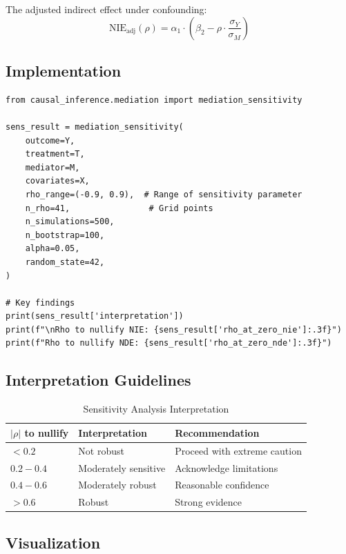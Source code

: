 The adjusted indirect effect under confounding:
\begin{equation}
\text{NIE}_{\text{adj}}(\rho) = \alpha_1 \cdot \left(\beta_2 - \rho \cdot \frac{\sigma_Y}{\sigma_M}\right)
\end{equation}

\subsection{Implementation}

\begin{verbatim}
from causal_inference.mediation import mediation_sensitivity

sens_result = mediation_sensitivity(
    outcome=Y,
    treatment=T,
    mediator=M,
    covariates=X,
    rho_range=(-0.9, 0.9),  # Range of sensitivity parameter
    n_rho=41,                # Grid points
    n_simulations=500,
    n_bootstrap=100,
    alpha=0.05,
    random_state=42,
)

# Key findings
print(sens_result['interpretation'])
print(f"\nRho to nullify NIE: {sens_result['rho_at_zero_nie']:.3f}")
print(f"Rho to nullify NDE: {sens_result['rho_at_zero_nde']:.3f}")
\end{verbatim}

\subsection{Interpretation Guidelines}

\begin{table}[h]
\centering
\caption{Sensitivity Analysis Interpretation}
\begin{tabular}{lll}
\toprule
$|\rho|$ to nullify & Interpretation & Recommendation \\
\midrule
$< 0.2$ & Not robust & Proceed with extreme caution \\
$0.2 - 0.4$ & Moderately sensitive & Acknowledge limitations \\
$0.4 - 0.6$ & Moderately robust & Reasonable confidence \\
$> 0.6$ & Robust & Strong evidence \\
\bottomrule
\end{tabular}
\end{table}

\subsection{Visualization}

